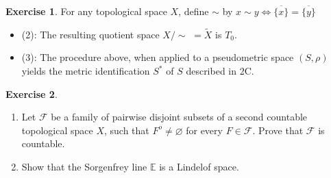 \documentclass[12pt]{extarticle}
\newcommand{\set}[1]{\{#1\}}
\newcommand{\<}{\langle}
\renewcommand{\>}{\rangle}
\renewcommand{\emptyset}{\varnothing}
\theoremstyle{definition}
\newtheorem{exercise}{Exercise}
\begin{document}
\begin{exercise}
  For any topological space $X$, define $\sim$ by $x \sim y \iff \overline{\set{x}} = \overline{\set{y}}$
  \begin{itemize}
  \item
    (2): The resulting quotient space $X/\sim$ $= \widetilde{X}$ is $T_0$.
  \item
    (3): The procedure above, when applied to a pseudometric space $(S, \rho)$ yields the metric identification $S^*$ of $S$ described in 2C. 
  \end{itemize}
\end{exercise}

\begin{exercise}
  \begin{enumerate}
  \item
    Let $\mathcal{F}$ be a family of pairwise disjoint subsets of a second countable topological space $X$, such that $F^o \neq \emptyset$ for every $F \in \mathcal{F}$.
    Prove that $\mathcal{F}$ is countable.
  \item
    Show that the Sorgenfrey line $\mathbb{E}$ is a Lindelof space.
  \end{enumerate}
\end{exercise}
\end{document}
